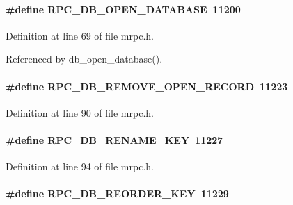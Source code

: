 \paragraph[{RPC\_\-DB\_\-OPEN\_\-DATABASE}]{\setlength{\rightskip}{0pt plus 5cm}\#define RPC\_\-DB\_\-OPEN\_\-DATABASE~11200}\hfill\label{group__mrpcdefineh_gaabff12e1182d8f6484ba9b0bdd0fa06e}

\begin{DoxyItemize}
\item 
\end{DoxyItemize}

Definition at line 69 of file mrpc.h.

Referenced by db\_\-open\_\-database().
\paragraph[{RPC\_\-DB\_\-REMOVE\_\-OPEN\_\-RECORD}]{\setlength{\rightskip}{0pt plus 5cm}\#define RPC\_\-DB\_\-REMOVE\_\-OPEN\_\-RECORD~11223}\hfill\label{group__mrpcdefineh_ga670adcfd772ae7332397e6e2fd279018}

\begin{DoxyItemize}
\item 
\end{DoxyItemize}

Definition at line 90 of file mrpc.h.
\paragraph[{RPC\_\-DB\_\-RENAME\_\-KEY}]{\setlength{\rightskip}{0pt plus 5cm}\#define RPC\_\-DB\_\-RENAME\_\-KEY~11227}\hfill\label{group__mrpcdefineh_ga6cd24f7da4784947e81c378cd7512d0d}

\begin{DoxyItemize}
\item 
\end{DoxyItemize}

Definition at line 94 of file mrpc.h.
\paragraph[{RPC\_\-DB\_\-REORDER\_\-KEY}]{\setlength{\rightskip}{0pt plus 5cm}\#define RPC\_\-DB\_\-REORDER\_\-KEY~11229}\hfill\label{group__mrpcdefineh_gaa4127b862cc0f07d7b5e708174f04343}

